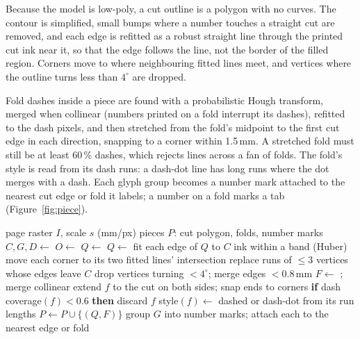 Because the model is low-poly, a cut outline is a polygon with no curves. The contour is
simplified, small bumps where a number touches a straight cut are removed, and each edge is
refitted as a robust straight line through the printed cut ink near it, so that the edge follows
the line, not the border of the filled region. Corners move to where neighbouring fitted lines
meet, and vertices where the outline turns less than $4^\circ$ are dropped.

Fold dashes inside a piece are found with a probabilistic Hough transform, merged when collinear
(numbers printed on a fold interrupt its dashes), refitted to the dash pixels, and then
stretched from the fold's midpoint to the first cut edge in each direction, snapping to a corner
within 1.5\,mm. A stretched fold must still be at least 60\,\% dashes, which rejects lines
across a fan of folds. The fold's style is read from its dash runs: a dash-dot line has long
runs where the dot merges with a dash. Each glyph group becomes a number mark attached to the
nearest cut edge or fold it labels; a number on a fold marks a tab (Figure~\ref{fig:piece}).

\begin{algorithm}[t]
\caption{Pieces, cut polygons and folds of one page}
\label{alg:pieces}
\begin{algorithmic}[1]
\Require page raster $I$, scale $s$ (mm/px)
\Ensure pieces $P$: cut polygon, folds, number marks
\State $C, G, D \gets$  
\State $O \gets$  
  \State $Q \gets$ 
  \State $Q \gets$  
  \Repeat
    \State fit each edge of $Q$ to $C$ ink within a band (Huber)
    \State move each corner to its two fitted lines' intersection
    \State replace runs of $\le 3$ vertices whose edges leave $C$
  \State drop vertices turning $< 4^\circ$; merge edges $< 0.8$\,mm
  \State $F \gets$ ; merge collinear
    \State extend $f$ to the cut on both sides; snap ends to corners
    \State \textbf{if} dash coverage$(f) < 0.6$ \textbf{then} discard $f$
    \State style$(f) \gets$ dashed or dash-dot from its run lengths
  \EndFor
  \State $P \gets P \cup \{(Q, F)\}$
\EndFor
\State group $G$ into number marks; attach each to the nearest edge or fold
\end{algorithmic}
\end{algorithm}


